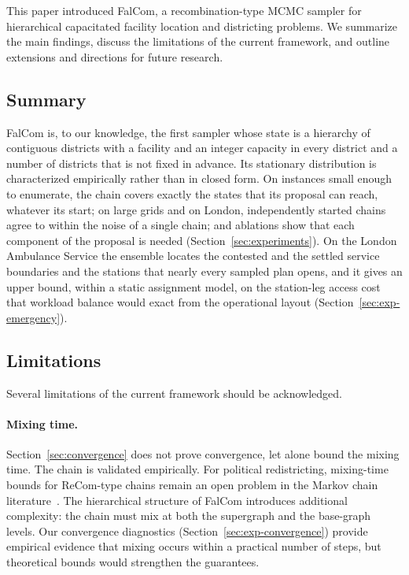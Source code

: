 \documentclass[11pt]{article}
\theoremstyle{definition}
\begin{document}
This paper introduced FalCom, a recombination-type MCMC sampler for hierarchical capacitated facility location and districting problems. We summarize the main findings, discuss the limitations of the current framework, and outline extensions and directions for future research.

\subsection{Summary}

FalCom is, to our knowledge, the first sampler whose state is a hierarchy of contiguous districts with a facility and an integer capacity in every district and a number of districts that is not fixed in advance. Its stationary distribution is characterized empirically rather than in closed form. On instances small enough to enumerate, the chain covers exactly the states that its proposal can reach, whatever its start; on large grids and on London, independently started chains agree to within the noise of a single chain; and ablations show that each component of the proposal is needed (Section~\ref{sec:experiments}). On the London Ambulance Service the ensemble locates the contested and the settled service boundaries and the stations that nearly every sampled plan opens, and it gives an upper bound, within a static assignment model, on the station-leg access cost that workload balance would exact from the operational layout (Section~\ref{sec:exp-emergency}).


\subsection{Limitations}
\label{sec:limitations}

Several limitations of the current framework should be acknowledged.



\paragraph{Mixing time.}
Section~\ref{sec:convergence} does not prove convergence, let alone bound the mixing time. The chain is validated empirically.  For political redistricting, mixing-time bounds for
ReCom-type chains remain an open problem in the Markov chain
literature~\citep{deford2021recombination}.  The hierarchical structure
of FalCom introduces additional complexity: the chain must mix at both
the supergraph and the base-graph levels.  Our convergence diagnostics
(Section~\ref{sec:exp-convergence}) provide empirical evidence that
mixing occurs within a practical number of steps, but theoretical
bounds would strengthen the guarantees.
\end{document}
